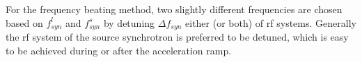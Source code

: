 %
For the frequency beating method, two slightly different frequencies are chosen based on $f_{\mathit{syn}}^{l}$ and $f_{\mathit{syn}}^{s}$ by detuning $\Delta f_\mathit{syn}$ either (or both) of rf systems. Generally the rf system of the source synchrotron is preferred to be detuned, which is easy to be achieved during or after the acceleration ramp. 


